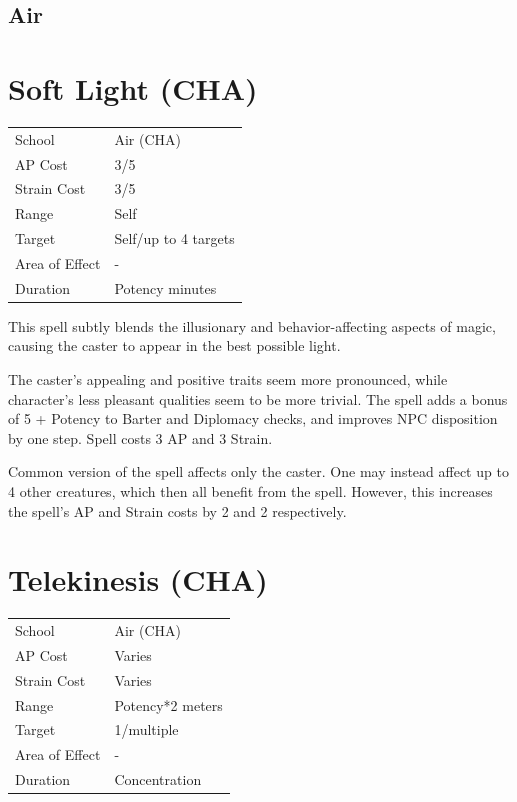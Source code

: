 \documentclass[11pt,a4paper,twocolumn]{book}
\begin{document}
	
	\subsection*{Air}
	
						\section*{Soft Light (CHA)}
	{
		\begin{tabu} to 75mm{| X[l,4] | X[l,7] |}
			\hline
			School 			&  Air (CHA)			\\
			AP Cost	      	&  3/5					\\
			Strain Cost     &  3/5					\\
			Range     		&  Self					\\
			Target      	&  Self/up to 4 targets	\\
			Area of Effect  &  -	 				\\
			Duration     	&  Potency minutes		\\ \hline
		\end{tabu}
		
	}
	
	\medskip
	
	This spell subtly blends the illusionary and behavior-affecting aspects of magic, causing the caster to appear in the best possible light.
	
	The caster's appealing and positive traits seem more pronounced, while character's less pleasant qualities seem to be more trivial. The spell adds a bonus of 5 + Potency to Barter and Diplomacy checks, and improves NPC disposition by one step. Spell costs 3 AP and 3 Strain.
	
	Common version of the spell affects only the caster. One may instead affect up to 4 other creatures, which then all benefit from the spell. However, this increases the spell's AP and Strain costs by 2 and 2 respectively.
	
					\section*{Telekinesis (CHA)}
	{
		\begin{tabu} to 75mm{| X[l,4] | X[l,7] |}
			\hline
			School 			&  Air (CHA)			\\
			AP Cost	      	&  Varies				\\
			Strain Cost     &  Varies				\\
			Range     		&  Potency*2 meters		\\
			Target      	&  1/multiple			\\
			Area of Effect  &  -	 				\\
			Duration     	&  Concentration		\\ \hline
		\end{tabu}
		
	}
	
\end{document}

